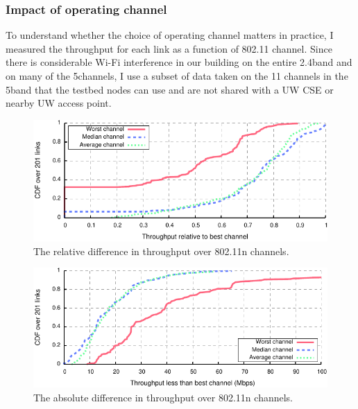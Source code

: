 \subsubsection{Impact of operating channel}
To understand whether the choice of operating channel matters in practice, I measured the throughput for each link as a function of 802.11 channel. Since there is considerable Wi-Fi interference in our building on the entire 2.4\GHz band and on many of the 5\GHz channels, I use a subset of data taken on the 11 channels in the 5\GHz band that the testbed nodes can use and are not shared with a UW CSE or nearby UW access point.

\begin{figure}[tp]
	\centering
	\includegraphics[width=\textwidth]{figures/applications/rel_diff.pdf}
	\caption{\label{fig:rel_diff}The relative difference in throughput over 802.11n channels.}
\end{figure}

\begin{figure}[tp]
	\centering
	\includegraphics[width=\textwidth]{figures/applications/tpt_diff.pdf}
	\caption{\label{fig:tpt_diff}The absolute difference in throughput over 802.11n channels.}
\end{figure}

